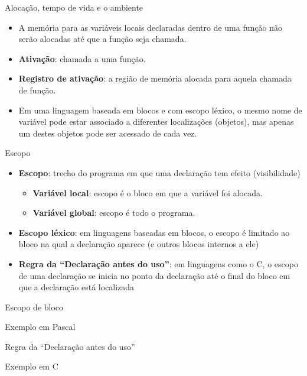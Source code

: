 \documentclass[handout,aspectratio=169]{beamer}
\newcommand{\bi}{\begin{itemize}[<+->]}
\newcommand{\ei}{\end{itemize}}
\begin{document}
\begin{frame}{Aloca\c{c}\~{a}o, tempo de vida e o ambiente}
	\bi
		\item A mem\'{o}ria para as vari\'{a}veis locais declaradas dentro de uma fun\c{c}\~{a}o n\~{a}o ser\~{a}o alocadas at\'{e} que a fun\c{c}\~{a}o seja chamada.
		\item \textbf{Ativa\c{c}\~{a}o}: chamada a uma fun\c{c}\~{a}o.
		\item \textbf{Registro de ativa\c{c}\~{a}o}: a regi\~{a}o de mem\'{o}ria alocada para aquela chamada de fun\c{c}\~{a}o.
        \item Em uma linguagem baseada em blocos e com escopo l\'{e}xico, o mesmo nome de vari\'{a}vel pode estar associado a diferentes localiza\c{c}\~{o}es (objetos), mas apenas um destes objetos pode ser acessado de cada vez.
	\ei
\end{frame}


\begin{frame}{Escopo}
	\bi
		\item \textbf{Escopo}: trecho do programa em que uma declara\c{c}\~{a}o tem efeito (visibilidade)
		\bi
			\item \textbf{Vari\'{a}vel local}: escopo \'{e} o bloco em que a vari\'{a}vel foi alocada.
			\item \textbf{Vari\'{a}vel global}: escopo \'{e} todo o programa.
		\ei
		\item \textbf{Escopo l\'{e}xico}: em linguagens baseadas em blocos, o escopo \'{e} limitado ao bloco na qual a declara\c{c}\~{a}o aparece (e outros blocos internos a ele)
		\item \textbf{Regra da ``Declara\c{c}\~{a}o antes do uso''}: em linguagens como o C, o escopo de uma declara\c{c}\~{a}o se inicia no ponto da declara\c{c}\~{a}o at\'{e} o final do bloco em que a declara\c{c}\~{a}o est\'{a} localizada
	\ei
\end{frame}



\begin{frame}[fragile]{Escopo de bloco}
	
		\begin{block}{Exemplo em Pascal}
		\centering
    \end{block}	

\end{frame}



\begin{frame}[fragile]{Regra da ``Declara\c{c}\~{a}o antes do uso''}
	
		\begin{block}{Exemplo em C}
		\centering
    \end{block}	

\end{frame}
\end{document}
